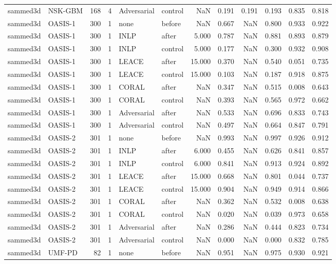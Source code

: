 \begin{tabular}{llrrllrrrrrr}
sammed3d & NSK-GBM & 168 & 4 & Adversarial & control & NaN & 0.191 & 0.191 & 0.193 & 0.835 & 0.818 \\
sammed3d & OASIS-1 & 300 & 1 & none & before & NaN & 0.667 & NaN & 0.800 & 0.933 & 0.922 \\
sammed3d & OASIS-1 & 300 & 1 & INLP & after & 5.000 & 0.787 & NaN & 0.881 & 0.893 & 0.879 \\
sammed3d & OASIS-1 & 300 & 1 & INLP & control & 5.000 & 0.177 & NaN & 0.300 & 0.932 & 0.908 \\
sammed3d & OASIS-1 & 300 & 1 & LEACE & after & 15.000 & 0.370 & NaN & 0.540 & 0.051 & 0.735 \\
sammed3d & OASIS-1 & 300 & 1 & LEACE & control & 15.000 & 0.103 & NaN & 0.187 & 0.918 & 0.875 \\
sammed3d & OASIS-1 & 300 & 1 & CORAL & after & NaN & 0.347 & NaN & 0.515 & 0.008 & 0.643 \\
sammed3d & OASIS-1 & 300 & 1 & CORAL & control & NaN & 0.393 & NaN & 0.565 & 0.972 & 0.662 \\
sammed3d & OASIS-1 & 300 & 1 & Adversarial & after & NaN & 0.533 & NaN & 0.696 & 0.833 & 0.743 \\
sammed3d & OASIS-1 & 300 & 1 & Adversarial & control & NaN & 0.497 & NaN & 0.664 & 0.847 & 0.791 \\
sammed3d & OASIS-2 & 301 & 1 & none & before & NaN & 0.993 & NaN & 0.997 & 0.926 & 0.912 \\
sammed3d & OASIS-2 & 301 & 1 & INLP & after & 6.000 & 0.455 & NaN & 0.626 & 0.841 & 0.857 \\
sammed3d & OASIS-2 & 301 & 1 & INLP & control & 6.000 & 0.841 & NaN & 0.913 & 0.924 & 0.892 \\
sammed3d & OASIS-2 & 301 & 1 & LEACE & after & 15.000 & 0.668 & NaN & 0.801 & 0.044 & 0.737 \\
sammed3d & OASIS-2 & 301 & 1 & LEACE & control & 15.000 & 0.904 & NaN & 0.949 & 0.914 & 0.866 \\
sammed3d & OASIS-2 & 301 & 1 & CORAL & after & NaN & 0.362 & NaN & 0.532 & 0.008 & 0.638 \\
sammed3d & OASIS-2 & 301 & 1 & CORAL & control & NaN & 0.020 & NaN & 0.039 & 0.973 & 0.658 \\
sammed3d & OASIS-2 & 301 & 1 & Adversarial & after & NaN & 0.286 & NaN & 0.444 & 0.823 & 0.734 \\
sammed3d & OASIS-2 & 301 & 1 & Adversarial & control & NaN & 0.000 & NaN & 0.000 & 0.832 & 0.785 \\
sammed3d & UMF-PD & 82 & 1 & none & before & NaN & 0.951 & NaN & 0.975 & 0.930 & 0.921 \\

\end{tabular}
